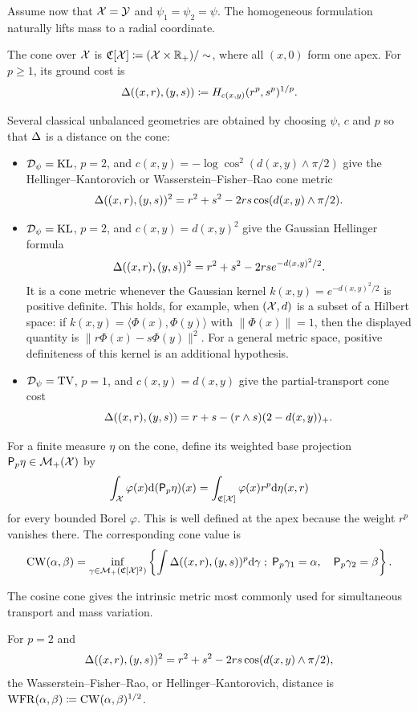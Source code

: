 Assume now that $\mathcal{X}=\mathcal{Y}$ and $\psi_1=\psi_2=\psi$. The homogeneous formulation naturally lifts mass to a radial coordinate.
\begin{defn}\label{def-unbalanced-cone-lift}
The cone over $\mathcal{X}$ is $\mathfrak C[\mathcal{X}]\coloneqq(\mathcal{X}\times\mathbb{R}_+)/\sim$, where all $(x,0)$ form one apex. For $p\geq1$, its ground cost is
\[
	\Delta((x,r),(y,s))\coloneqq H_{c(x,y)}(r^p,s^p)^{1/p}.
\]
\end{defn}
Several classical unbalanced geometries are obtained by choosing $\psi$, $c$ and $p$ so that $\Delta$ is a distance on the cone:
\begin{itemize}
	\item $\mathcal{D}_\psi=\operatorname{KL}$, $p=2$, and $c(x,y)=-\log\cos^2(d(x,y)\wedge\pi/2)$ give the Hellinger--Kantorovich or Wasserstein--Fisher--Rao cone metric
	\[
		\Delta((x,r),(y,s))^2=r^2+s^2-2rs\cos(d(x,y)\wedge\pi/2).
	\]
	\item $\mathcal{D}_\psi=\operatorname{KL}$, $p=2$, and $c(x,y)=d(x,y)^2$ give the Gaussian Hellinger formula
	\[
		\Delta((x,r),(y,s))^2=r^2+s^2-2rs e^{-d(x,y)^2/2}.
	\]
	It is a cone metric whenever the Gaussian kernel $k(x,y)=e^{-d(x,y)^2/2}$ is positive definite. This holds, for example, when $(\mathcal{X},d)$ is a subset of a Hilbert space: if $k(x,y)=\langle\Phi(x),\Phi(y)\rangle$ with $\|\Phi(x)\|=1$, then the displayed quantity is $\|r\Phi(x)-s\Phi(y)\|^2$. For a general metric space, positive definiteness of this kernel is an additional hypothesis.
	\item $\mathcal{D}_\psi=\operatorname{TV}$, $p=1$, and $c(x,y)=d(x,y)$ give the partial-transport cone cost
	\[
		\Delta((x,r),(y,s))=r+s-(r\wedge s)(2-d(x,y))_+.
	\]
\end{itemize}
For a finite measure $\eta$ on the cone, define its weighted base projection
$\mathsf P_p\eta\in\mathcal{M}_+(\mathcal{X})$ by
\[
	\int_{\mathcal{X}}\varphi(x)\mathrm{d}(\mathsf P_p\eta)(x)
	=
	\int_{\mathfrak C[\mathcal{X}]}\varphi(x)r^p\mathrm{d}\eta(x,r)
\]
for every bounded Borel $\varphi$. This is well defined at the apex because
the weight $r^p$ vanishes there. The corresponding cone value is
\[
	\operatorname{CW}(\alpha,\beta)
	=
	\inf_{\gamma\in\mathcal{M}_+(\mathfrak C[\mathcal{X}]^2)}
	\left\{
	\int \Delta((x,r),(y,s))^p\mathrm{d}\gamma
	\; ; \;
	\mathsf P_p\gamma_1=\alpha,\quad
	\mathsf P_p\gamma_2=\beta
	\right\}.
\]

The cosine cone gives the intrinsic metric most commonly used for simultaneous transport and mass variation.
\begin{defn}\label{def-wfr-distance}
For $p=2$ and
\[
\Delta((x,r),(y,s))^2=r^2+s^2-2rs\cos(d(x,y)\wedge\pi/2),
\]
the Wasserstein--Fisher--Rao, or Hellinger--Kantorovich, distance is
$\operatorname{WFR}(\alpha,\beta)\coloneqq\operatorname{CW}(\alpha,\beta)^{1/2}$.
\end{defn}

